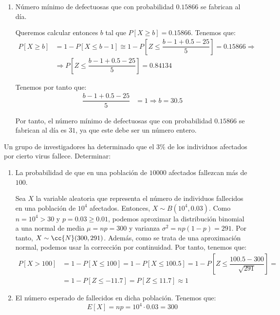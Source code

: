 \begin{ejercicio}
\begin{enumerate}
        \item Número mínimo de defectuosas que con probabilidad $0.15866$ se fabrican al día.
        
        Queremos calcular entonces $b$ tal que $P[X\geq b] = 0.15866$. Tenemos que:
        \begin{align*}
            P[X\geq b] &= 1-P[X\leq b-1] \cong 1-P\left[Z\leq \dfrac{b-1+0.5-25}{5}\right] = 0.15866
            \Longrightarrow \\
            & \Longrightarrow
            P\left[Z\leq \dfrac{b-1+0.5-25}{5}\right] = 0.84134
        \end{align*}

        Tenemos por tanto que:
        \begin{align*}
            \dfrac{b-1+0.5-25}{5} &= 1 \Longrightarrow b = 30.5
        \end{align*}

        Por tanto, el número mínimo de defectuosas que con probabilidad $0.15866$ se fabrican al día es $31$, ya que este debe ser un número entero.
    \end{enumerate}
\end{ejercicio}

\begin{ejercicio}
    Un grupo de investigadores ha determinado que el $3\%$ de los individuos afectados por cierto virus fallece. Determinar:
    \begin{enumerate}
        \item La probabilidad de que en una población de $10000$ afectados fallezcan más de $100$.
        
        Sea $X$ la variable aleatoria que representa el número de individuos fallecidos en una población de $10^4$ afectados. Entonces, $X\sim B(10^4,0.03)$.
        Como $n=10^4>30$ y $p=0.03\geq 0.01$, podemos aproximar la distribución binomial a una normal de media $\mu=np=300$ y varianza $\sigma^2=np(1-p)=291$. Por tanto, $X\sim \cc{N}(300,291)$.
        Además, como se trata de una aproximación normal, podemos usar la corrección por continuidad. Por tanto, tenemos que:
        \begin{align*}
            P[X>100] &= 1-P[X\leq 100] = 1-P[X\leq 100.5] = 1-P\left[Z\leq \dfrac{100.5-300}{\sqrt{291}}\right] =\\& = 1-P\left[Z\leq -11.7\right] =
            P[Z\leq 11.7] \approx 1
        \end{align*}
        \item El número esperado de fallecidos en dicha población.
        Tenemos que:
        \begin{equation*}
            E[X] = np = 10^4\cdot 0.03 = 300
        \end{equation*}
    \end{enumerate}
\end{ejercicio}

